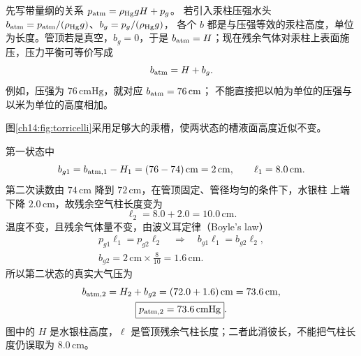\begin{xesolution}
先写带量纲的关系 $p_{\rm atm}=\rho_{\rm Hg}gH+p_g$。
若引入汞柱压强水头 $b_{\rm atm}=p_{\rm atm}/(\rho_{\rm Hg}g)$、$b_g=p_g/(\rho_{\rm Hg}g)$，
各个 $b$ 都是与压强等效的汞柱高度，单位为长度。管顶若是真空，$b_g=0$，于是
$b_{\rm atm}=H$；现在残余气体对汞柱上表面施压，压力平衡可等价写成
\begin{equation}
  b_{\rm atm}=H+b_g.
\end{equation}
例如，压强为 $76\,\mathrm{cmHg}$，就对应 $b_{\rm atm}=76\,\mathrm{cm}$；
不能直接把以帕为单位的压强与以米为单位的高度相加。

图\ref{ch14:fig:torricelli}采用足够大的汞槽，使两状态的槽液面高度近似不变。
\torricelliDiagram

第一状态中
\begin{equation}
  b_{g1}=b_{\rm atm,1}-H_1=(76-74)\,\mathrm{cm}=2\,\mathrm{cm},
  \qquad \ell_1=8.0\,\mathrm{cm}.
\end{equation}
第二次读数由 $74\,\mathrm{cm}$ 降到 $72\,\mathrm{cm}$，在管顶固定、管径均匀的条件下，水银柱
上端下降 $2.0\,\mathrm{cm}$，故残余空气柱长度变为
\begin{equation}
  \ell_2=8.0+2.0=10.0\,\mathrm{cm}.
\end{equation}
温度不变，且残余气体量不变，由波义耳定律（Boyle's law）
\begin{equation}
  \begin{gathered}
  p_{g1}\ell_1=p_{g2}\ell_2
  \quad\Longrightarrow\quad b_{g1}\ell_1=b_{g2}\ell_2,
  \\
  b_{g2}=2\,\mathrm{cm}\times\frac{8}{10}=1.6\,\mathrm{cm}.
  \end{gathered}
\end{equation}
所以第二状态的真实大气压为
\begin{equation}
  \begin{gathered}
  b_{\rm atm,2}=H_2+b_{g2}=(72.0+1.6)\,\mathrm{cm}=73.6\,\mathrm{cm},
  \\
  \boxed{p_{\rm atm,2}=73.6\,\mathrm{cmHg}}.
  \end{gathered}
\end{equation}
图中的 $H$ 是水银柱高度，$\ell$ 是管顶残余气柱长度；二者此消彼长，不能把气柱长度仍误取为
$8.0\,\mathrm{cm}$。
\end{xesolution}
